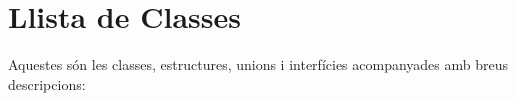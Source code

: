 \section{Llista de Classes}
Aquestes són les classes, estructures, unions i interfícies acompanyades amb breus descripcions\+:\begin{DoxyCompactList}
\item{}
\item{}
\end{DoxyCompactList}
